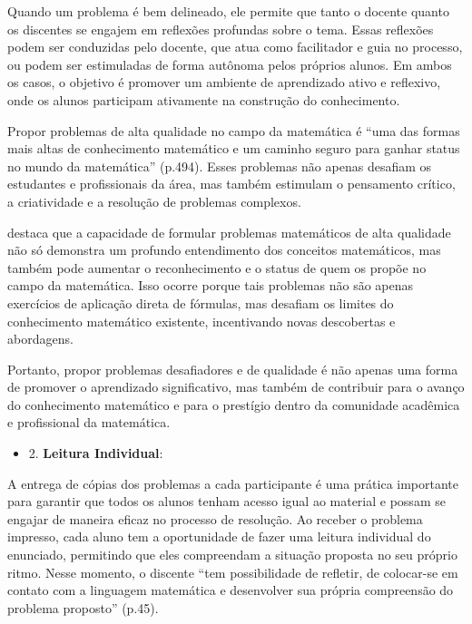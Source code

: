 Quando um problema é bem delineado, ele permite que tanto o docente quanto os discentes se engajem em reflexões profundas sobre o tema. Essas reflexões podem ser conduzidas pelo docente, que atua como facilitador e guia no processo, ou podem ser estimuladas de forma autônoma pelos próprios alunos. Em ambos os casos, o objetivo é promover um ambiente de aprendizado ativo e reflexivo, onde os alunos participam ativamente na construção do conhecimento.

Propor problemas de alta qualidade no campo da matemática é ``uma das formas mais altas de conhecimento matemático e um caminho seguro para ganhar
status no mundo da matemática'' \cite{CRESPO2015} (p.494). Esses problemas não apenas desafiam os estudantes e profissionais da área, mas também estimulam o pensamento crítico, a criatividade e a resolução de problemas complexos.

 destaca que a capacidade de formular problemas matemáticos de alta qualidade não só demonstra um profundo entendimento dos conceitos matemáticos, mas também pode aumentar o reconhecimento e o status de quem os propõe no campo da matemática. Isso ocorre porque tais problemas não são apenas exercícios de aplicação direta de fórmulas, mas desafiam os limites do conhecimento matemático existente, incentivando novas descobertas e abordagens.

Portanto, propor problemas desafiadores e de qualidade é não apenas uma forma de promover o aprendizado significativo, mas também de contribuir para o avanço do conhecimento matemático e para o prestígio dentro da comunidade acadêmica e profissional da matemática.


\begin{itemize}
    \item 2. \textbf{Leitura Individual}:
\end{itemize}

A entrega de cópias dos problemas a cada participante é uma prática importante para garantir que todos os alunos tenham acesso igual ao material e possam se engajar de maneira eficaz no processo de resolução. Ao receber o problema impresso, cada aluno tem a oportunidade de fazer uma leitura individual do enunciado, permitindo que eles compreendam a situação proposta no seu próprio ritmo. Nesse momento, o discente ``tem possibilidade de refletir, de colocar-se em contato com a linguagem matemática e desenvolver sua própria compreensão do problema proposto'' \cite{OSHIMA2011} (p.45).

